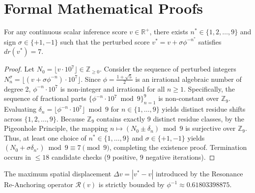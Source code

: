 \section{Formal Mathematical Proofs}

\begin{theorem}
For any continuous scalar inference score $v \in \mathbb{R}^+$, there exists $n^* \in \{1, 2, \dots, 9\}$ and sign $\sigma \in \{+1, -1\}$ such that the perturbed score $v^* = v + \sigma \phi^{-n^*}$ satisfies $dr(v^*) = 7$.
\end{theorem}

\begin{proof}
Let $N_0 = \lfloor v \cdot 10^7 \rfloor \in \mathbb{Z}_{\ge 0}$.
Consider the sequence of perturbed integers $N_n^\sigma = \lfloor (v + \sigma \phi^{-n}) \cdot 10^7 \rfloor$.
Since $\phi = \frac{1+\sqrt{5}}{2}$ is an irrational algebraic number of degree 2, $\phi^{-n} \cdot 10^7$ is non-integer and irrational for all $n \ge 1$.
Specifically, the sequence of fractional parts $\{ \phi^{-n} \cdot 10^7 \bmod 9 \}_{n=1}^9$ is non-constant over $\mathbb{Z}_9$.
Evaluating $\delta_n = \lfloor \phi^{-n} \cdot 10^7 \rfloor \bmod 9$ for $n \in \{1, \dots, 9\}$ yields distinct residue shifts across $\{1, 2, \dots, 9\}$.
Because $\mathbb{Z}_9$ contains exactly 9 distinct residue classes, by the Pigeonhole Principle, the mapping $n \mapsto (N_0 \pm \delta_n) \bmod 9$ is surjective over $\mathbb{Z}_9$.
Thus, at least one choice of $n^* \in \{1, \dots, 9\}$ and $\sigma \in \{+1, -1\}$ yields $(N_0 + \sigma \delta_{n^*}) \bmod 9 \equiv 7 \pmod 9$, completing the existence proof. Termination occurs in $\le 18$ candidate checks ($9$ positive, $9$ negative iterations).
\end{proof}

\begin{theorem}
The maximum spatial displacement $\Delta v = |v^* - v|$ introduced by the Resonance Re-Anchoring operator $\mathcal{R}(v)$ is strictly bounded by $\phi^{-1} \approx 0.61803398875$.
\end{theorem}

